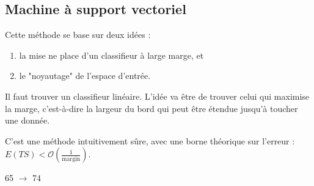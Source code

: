 \subsection{Machine à support vectoriel}

Cette méthode se base sur deux idées :

\begin{enumerate}
	\item la mise ne place d'un classifieur à large marge, et
	\item le "noyautage" de l'espace d'entrée.
\end{enumerate}

Il faut trouver un classifieur linéaire. L'idée va être de trouver celui qui maximise la marge, c'est-à-dire la largeur du bord qui peut être étendue jusqu'à toucher une donnée.


C'est une méthode intuitivement sûre, avec une borne théorique sur l'erreur : $E(TS) < \mathcal{O}(\frac{1}{\text{margin}})$.

65 $\rightarrow$ 74
